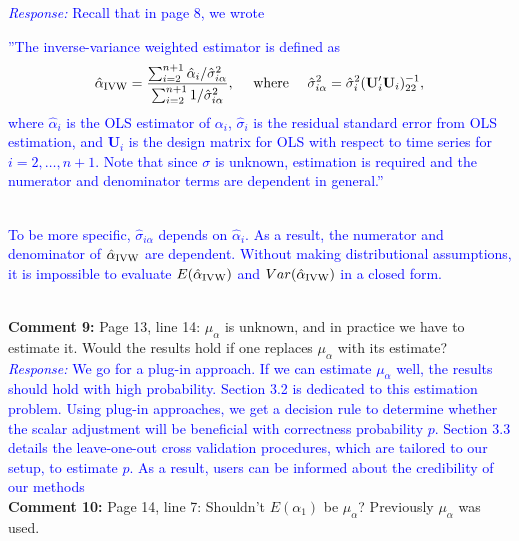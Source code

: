 \documentclass[12pt]{article}
\newcommand{\response}[1]{\noindent \textcolor{blue}{\emph{Response:} #1}}
\begin{document}
\response{Recall that in page 8, we wrote \\
\begin{tcolorbox}
''The inverse-variance weighted estimator is defined as 
\begin{align*}
  \hat{\alpha}_{\rm IVW} = \frac{\sum_{i=2}^{n+1} \hat{\alpha}_i / \hat{\sigma}_{i\alpha}^2}{\sum_{i=2}^{n+1} 1/\hat{\sigma}_{i\alpha}^2},
  \quad \text{ where } \quad  \hat{\sigma}_{i\alpha}^2 = \hat{\sigma}^2_i( \mathbf{U}_i'\mathbf{U}_i)_{22}^{-1},
\end{align*}
where  $\hat{\alpha}_i$ is the OLS estimator of $\alpha_i$, 
$\hat{\sigma}_i$ is the residual standard error from OLS estimation, 
and $\mathbf{U}_i$ is the design matrix for OLS with respect to time series 
for $i = 2, \ldots, n+1$. Note that since $\sigma$ is unknown, estimation 
is required and the numerator and denominator terms are dependent in general.''
\end{tcolorbox} \\
To be more specific, $\hat{\sigma}_{i\alpha}$ depends on $\hat{\alpha}_i$. As a result, the numerator and denominator of $ \hat{\alpha}_{\rm IVW}$ are dependent. Without making distributional assumptions, it is impossible to evaluate $E(\hat{\alpha}_{\rm IVW})$ and $Var(\hat{\alpha}_{\rm IVW})$ in a closed form.}\\

{\bf Comment 9:} Page 13, line 14: $\mu_{\alpha}$ is unknown, and in practice we have to estimate it. Would the results hold if one replaces $\mu_{\alpha}$ with its estimate? \\

\response{We go for a plug-in approach. If we can estimate $\mu_{\alpha}$ well, the results should hold with high probability. Section 3.2 is dedicated to this estimation problem. Using plug-in approaches, we get a decision rule to determine whether the scalar adjustment will be beneficial with correctness probability $p$. Section 3.3 details the leave-one-out cross validation procedures, which are tailored to our setup, to estimate $p$. As a result, users can be informed about the credibility of our methods} \\


{\bf Comment 10:} Page 14, line 7: Shouldn’t $E(\alpha_1)$ be $\mu_{\alpha}$? Previously $\mu_{\alpha}$ was used.\\
\end{document}
